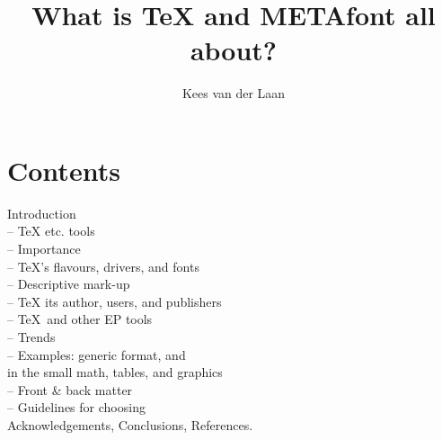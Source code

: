 \def\maketypebox{\makeblankbox{0pt}{1pt}}
\def\makelightbox{\makeblankbox{.2pt}{.2pt}}
\def\<#1>{$\langle#1\rangle$}
\def\cs#1{{\tt\char92#1}}
%
\def\mm{{\tt manmac}}
\def\mmt{{\tt manmac.sty}}
\let\ea=\expandafter \let\ag=\aftergroup \let\nx=\noexpand
\def\pfoottext{NLUUG meeting Fall '93}
%


\title{What is \TeX{} and METAfont all about?}
\author{Kees van der Laan}
\address{Hunzeweg 57, 9893 PB\\
        Garnwerd, Groningen (NL)\\
        +31 5941 1525}
\maketitle
\section*{Contents}%
\begingroup\small
Introduction\\
-- \TeX{} etc.{} tools\\
-- Importance\\
-- \TeX's flavours, drivers, and fonts\\
-- Descriptive mark-up\\
-- \TeX{} its author, users, and publishers\\
-- \TeX\ and other EP tools\\
-- Trends\\
-- Examples: generic format, and\\
\phantom{--} in the small math, tables, and graphics\\
-- Front \& back matter \\
-- Guidelines for choosing\\
Acknowledgements, Conclusions, References.
\endgroup
